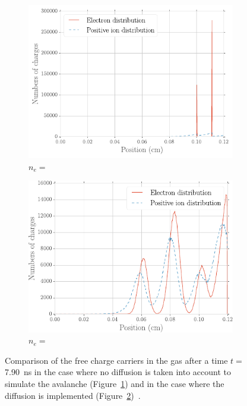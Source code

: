 	\begin{figure}[H]
		\begin{subfigure}{0.5\linewidth}
			\centering
			\includegraphics[width = 0.55\plotwidth]{fig/chapt4/Elec_distrib_no_diff.pdf}
			\caption{\label{fig:Diff-Distrib:A} $n_e =$ }
		\end{subfigure}
		\begin{subfigure}{0.5\linewidth}
			\centering
			\includegraphics[width = 0.55\plotwidth]{fig/chapt4/Elec_distrib_w_diff.pdf}
			\caption{\label{fig:Diff-Distrib:B} $n_e =$ }
		\end{subfigure}
		\caption{\label{fig:Diff-Distrib} Comparison of the free charge carriers in the gas after a time $t =$ \SI{7.90}{ns} in the case where no diffusion is taken into account to simulate the avalanche (Figure~\ref{fig:Diff-Distrib:A}) and in the case where the diffusion is implemented (Figure~\ref{fig:Diff-Distrib:B})~\cite{VINCENT2017}.}
	\end{figure}
	
